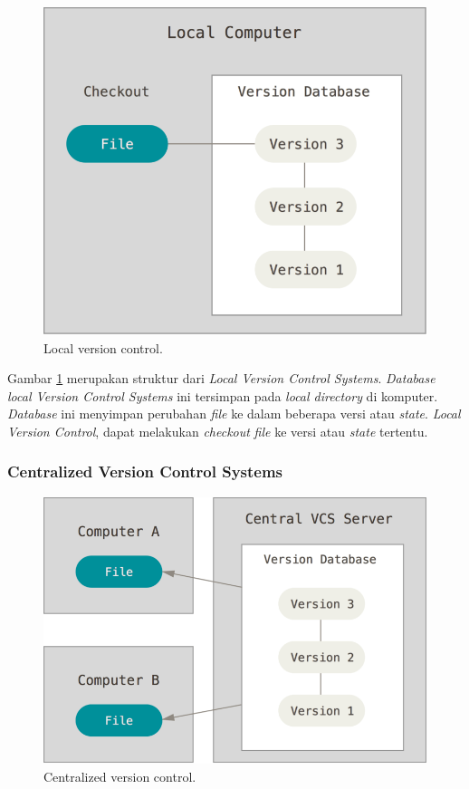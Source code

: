 \begin{figure}[H]
	\centering
		\includegraphics[scale=0.25]{Gambar/localvcs.png}
	\caption{Local version control\cite{chacon2014pro}.}
	\label{fig:localvcs}
\end{figure}

Gambar \ref{fig:localvcs} merupakan struktur dari \textit{Local Version Control Systems}. \textit{Database local Version Control Systems} ini tersimpan pada \textit{local directory} di komputer. \textit{Database} ini menyimpan perubahan \textit{file} ke dalam beberapa versi atau \textit{state}. \textit{Local Version Control}, dapat melakukan \textit{checkout} \textit{file} ke versi atau \textit{state} tertentu.   
 
\subsubsection{Centralized Version Control Systems}
\begin{figure}[H]
	\centering
		\includegraphics[scale=0.25]{Gambar/centralizedvcs.png}
	\caption{Centralized version control\cite{chacon2014pro}.}
	\label{fig:cvcs}
\end{figure}

